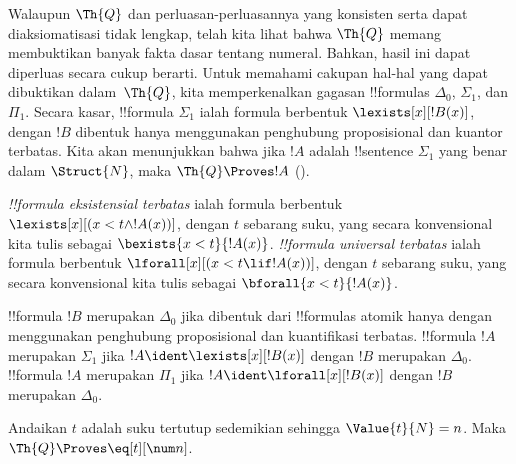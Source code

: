\documentclass[../../../include/open-logic-section]{subfiles}
\begin{document}

Walaupun $\Th{Q}$ dan perluasan-perluasannya yang konsisten serta dapat
diaksiomatisasi tidak lengkap, telah kita lihat bahwa $\Th{Q}$ memang
membuktikan banyak fakta dasar tentang numeral. Bahkan, hasil ini dapat
diperluas secara cukup berarti. Untuk memahami cakupan hal-hal yang dapat
dibuktikan dalam~$\Th{Q}$, kita memperkenalkan gagasan !!{formula}s
$\Delta_0$, $\Sigma_1$, dan $\Pi_1$. Secara kasar, !!{formula} $\Sigma_1$
ialah formula berbentuk $\lexists[x][!B(x)]$, dengan $!B$ dibentuk hanya
menggunakan penghubung proposisional dan kuantor terbatas. Kita akan
menunjukkan bahwa jika $!A$ adalah !!{sentence} $\Sigma_1$ yang benar dalam
$\Struct{N}$, maka $\Th{Q} \Proves !A$
().

\begin{defn}
\emph{!!{formula} eksistensial terbatas} ialah formula berbentuk
$\lexists[x][(x < t \land !A(x))]$, dengan $t$ sebarang suku, yang secara
konvensional kita tulis sebagai $\bexists{x < t}{!A(x)}$.
%
\emph{!!{formula} universal terbatas} ialah formula berbentuk
$\lforall[x][(x < t \lif !A(x))]$, dengan $t$ sebarang suku, yang secara
konvensional kita tulis sebagai $\bforall{x < t}{!A(x)}$.
\end{defn}

\begin{defn}
!!{formula} $!B$ merupakan $\Delta_0$ jika dibentuk dari !!{formula}s atomik
hanya dengan menggunakan penghubung proposisional dan kuantifikasi terbatas.
%
!!{formula} $!A$ merupakan $\Sigma_1$ jika
$!A \ident \lexists[x][!B(x)]$ dengan $!B$ merupakan $\Delta_0$.
%
!!{formula} $!A$ merupakan $\Pi_1$ jika
$!A \ident \lforall[x][!B(x)]$ dengan $!B$ merupakan $\Delta_0$.
\end{defn}

\begin{lem}
 Andaikan $t$ adalah suku tertutup sedemikian
sehingga $\Value{t}{N} = n$. Maka $\Th{Q} \Proves \eq[t][\num n]$.
\end{lem}
\end{document}
